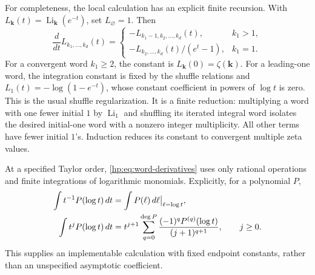 \documentclass[11pt,a4paper]{article}
\numberwithin{equation}{section}
\theoremstyle{definition}
\theoremstyle{remark}
\begin{document}
For completeness, the local calculation has an explicit finite
recursion. With $L_{\boldsymbol{k}}(t)=
\operatorname{Li}_{\boldsymbol{k}}(e^{-t})$, set $L_{\varnothing}=1$.
Then
\begin{equation}\label{hp:eq:word-derivatives}
 \frac{d}{dt}L_{k_1,\ldots,k_d}(t)=
 \begin{cases}
  -L_{k_1-1,k_2,\ldots,k_d}(t),& k_1>1,\\
  -L_{k_2,\ldots,k_d}(t)/(e^t-1),& k_1=1.
 \end{cases}
\end{equation}
For a convergent word $k_1\ge2$, the constant is
$L_{\boldsymbol{k}}(0)=\zeta(\boldsymbol{k})$.
For a leading-one word, the integration constant is fixed by the
shuffle relations and $L_1(t)=-\log(1-e^{-t})$, whose constant
coefficient in powers of $\log t$ is zero. This is the usual shuffle
regularization. It is a finite reduction: multiplying a word with one
fewer initial $1$ by $\operatorname{Li}_1$ and shuffling its iterated
integral word isolates the desired initial-one word with a nonzero
integer multiplicity. All other terms have fewer initial $1$'s.
Induction reduces its constant to convergent multiple zeta values.

At a specified Taylor order, \eqref{hp:eq:word-derivatives} uses only
rational operations and finite integrations of logarithmic monomials.
Explicitly, for a polynomial $P$,
\begin{align}
 \int t^{-1}P(\log t)\,dt
   &=\int P(\ell)\,d\ell\big|_{\ell=\log t},\notag\\
 \int t^jP(\log t)\,dt
   &=t^{j+1}\sum_{q=0}^{\deg P}
           \frac{(-1)^qP^{(q)}(\log t)}{(j+1)^{q+1}},
                       \qquad j\ge0.\label{hp:eq:finite-integration}
\end{align}
This supplies an implementable calculation with fixed endpoint
constants, rather than an unspecified asymptotic coefficient.
\end{document}
